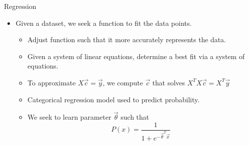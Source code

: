 \documentclass[11pt]{beamer}
\begin{document}
\begin{frame}{Regression}
\begin{itemize}
    \item Given a dataset, we seek a function to fit the data points.
    \begin{itemize}
        \item Adjust function such that it more accurately represents the data.
    \end{itemize}
    \begin{itemize}
        \item Given a system of linear equations, determine a best fit via a system of equations.
        \item To approximate $X \vec{c} = \vec{y}$, we compute $\vec{c}$ that solves $X^T X \vec{c} = X^T \vec{y}$
    \end{itemize}
    \begin{itemize}
        \item Categorical regression model used to predict probability.
        \item We seek to learn parameter $\vec{\theta}$ such that \[P(x) = \frac{1}{1 + e^{-\vec{\theta}^T \vec{x}}}\]
    \end{itemize}
\end{itemize}
\end{frame}
\end{document}
